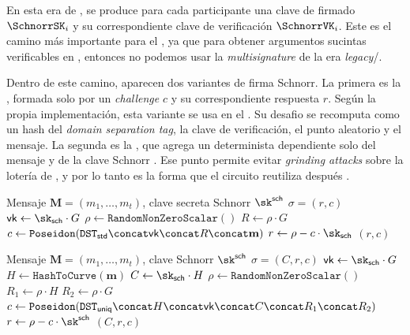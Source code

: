 En esta era de \Mithril, se produce para cada participante una clave de firmado $\SchnorrSK_i$ y su correspondiente clave de verificación $\SchnorrVK_i$. Este es el camino más importante para el \zkBridge, ya que para obtener argumentos sucintas verificables \Onchain en \ChainB, entonces no podemos usar la \BLS \textit{multisignature} de la era \textit{legacy}/\Pythagoras.

Dentro de este camino, aparecen dos variantes de firma Schnorr. La primera es la \StandardSchnorrSignature, formada solo por un \textit{challenge} $c$ y su correspondiente respuesta $r$. Según la propia implementación, esta variante se usa en el \SNARK \GenesisCertificate. Su desafio se recomputa como un hash \PoseidonHash del \textit{domain separation tag}, la clave de verificación, el punto aleatorio y el mensaje. La segunda es la \UniqueSchnorrSignature, que agrega un \CommitmentPoint determinista dependiente solo del mensaje y de la clave Schnorr \SchnorrSK. Ese punto permite evitar \textit{grinding attacks} sobre la lotería de \MithrilAggregator, y por lo tanto es la forma que el circuito \HaloTwo reutiliza después \cite{MithrilSTMRepo}.

\begin{algorithm}[ht]
	\caption{\StandardSchnorrSignature en la era \Lagrange}
	\label{alg:mithril-lagrange-standard-schnorr-sign}
	\begin{algorithmic}[1]
		\Require Mensaje $\mathbf{M} = (m_1, \ldots, m_t)$, clave secreta Schnorr $\sk^{\mathsf{sch}}$
		\Ensure $\sigma = (r, c)$
		\State $\mathsf{vk} \gets \sk_{\mathsf{sch}} \cdot G$
		\State $\rho \gets \texttt{RandomNonZeroScalar}()$
		\State $R \gets \rho \cdot G$
		\State $c \gets \texttt{Poseidon}(\texttt{DST}_{\mathsf{std}} \concat \mathsf{vk} \concat R \concat \mathbf{m})$
		\State $r \gets \rho - c \cdot \sk_{\mathsf{sch}}$
		\State \Return $(r, c)$
	\end{algorithmic}
\end{algorithm}

\begin{algorithm}[ht]
	\caption{\UniqueSchnorrSignature en la era \Lagrange}
	\label{alg:mithril-lagrange-unique-schnorr-sign}
	\begin{algorithmic}[1]
		\Require Mensaje $\mathbf{M} = (m_1,\ldots,m_t)$, clave Schnorr $\sk^{\mathsf{sch}}$
		\Ensure $\sigma = (C, r, c)$
		\State $\mathsf{vk} \gets \sk_{\mathsf{sch}} \cdot G$
		\State $H \gets \texttt{HashToCurve}(\mathbf{m})$
		\State $C \gets \sk_{\mathsf{sch}} \cdot H$ \Comment{\CommitmentPoint}
		\State $\rho \gets \texttt{RandomNonZeroScalar}()$
		\State $R_1 \gets \rho \cdot H$
		\State $R_2 \gets \rho \cdot G$
		\State $c \gets \texttt{Poseidon}(\texttt{DST}_{\mathsf{uniq}} \concat H \concat \mathsf{vk} \concat C \concat R_1 \concat R_2)$
		\State $r \gets \rho - c \cdot \sk^{\mathsf{sch}}$
		\State \Return $(C, r, c)$
	\end{algorithmic}
\end{algorithm}

